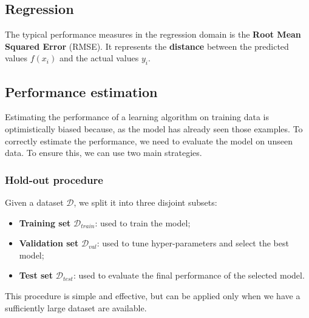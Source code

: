 \subsection{Regression}
The typical performance measures in the regression domain is the \textbf{Root Mean Squared Error} (RMSE).
It represents the \textbf{distance} between the predicted values $f(x_i)$ and the actual values $y_i$.

\subsection{Performance estimation}
Estimating the performance of a learning algorithm on training data is optimistically biased because, as the model has already seen those examples.
To correctly estimate the performance, we need to evaluate the model on unseen data.
To ensure this, we can use two main strategies.

\subsubsection{Hold-out procedure}
Given a dataset $\mathcal{D}$, we split it into three disjoint subsets:
\begin{itemize}
	\item \textbf{Training set} $\mathcal{D}_{train}$: used to train the model;
	\item \textbf{Validation set} $\mathcal{D}_{val}$: used to tune hyper-parameters and select the best model;
	\item \textbf{Test set} $\mathcal{D}_{test}$: used to evaluate the final performance of the selected model.
\end{itemize} 
This procedure is simple and effective, but can be applied only when we have a sufficiently large dataset are available.

